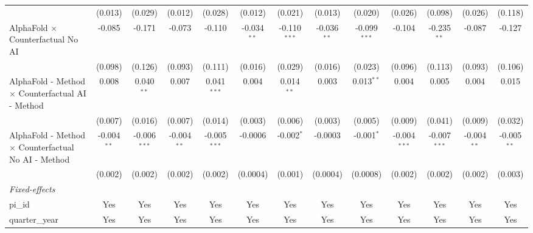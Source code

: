 \begin{tabular}{lcccccccccccc}
                                                              & (0.013)       & (0.029)        & (0.012)       & (0.028)        & (0.012)       & (0.021)        & (0.013)       & (0.020)        & (0.026)        & (0.098)        & (0.026)       & (0.118)\\   
   AlphaFold $\times$ Counterfactual No AI                    & -0.085        & -0.171         & -0.073        & -0.110         & -0.034$^{**}$ & -0.110$^{***}$ & -0.036$^{**}$ & -0.099$^{***}$ & -0.104         & -0.235$^{**}$  & -0.087        & -0.127\\   
                                                              & (0.098)       & (0.126)        & (0.093)       & (0.111)        & (0.016)       & (0.029)        & (0.016)       & (0.023)        & (0.096)        & (0.113)        & (0.093)       & (0.106)\\   
   AlphaFold - Method $\times$ Counterfactual AI - Method     & 0.008         & 0.040$^{**}$   & 0.007         & 0.041$^{***}$  & 0.004         & 0.014$^{**}$   & 0.003         & 0.013$^{**}$   & 0.004          & 0.005          & 0.004         & 0.015\\   
                                                              & (0.007)       & (0.016)        & (0.007)       & (0.014)        & (0.003)       & (0.006)        & (0.003)       & (0.005)        & (0.009)        & (0.041)        & (0.009)       & (0.032)\\   
   AlphaFold - Method $\times$ Counterfactual No AI - Method  & -0.004$^{**}$ & -0.006$^{***}$ & -0.004$^{**}$ & -0.005$^{***}$ & -0.0006       & -0.002$^{*}$   & -0.0003       & -0.001$^{*}$   & -0.004$^{***}$ & -0.007$^{***}$ & -0.004$^{**}$ & -0.005$^{**}$\\   
                                                              & (0.002)       & (0.002)        & (0.002)       & (0.002)        & (0.0004)      & (0.001)        & (0.0004)      & (0.0008)       & (0.002)        & (0.002)        & (0.002)       & (0.003)\\   
   \midrule
   \emph{Fixed-effects}\\
   pi\_id                                                     & Yes           & Yes            & Yes           & Yes            & Yes           & Yes            & Yes           & Yes            & Yes            & Yes            & Yes           & Yes\\  
   quarter\_year                                              & Yes           & Yes            & Yes           & Yes            & Yes           & Yes            & Yes           & Yes            & Yes            & Yes            & Yes           & Yes\\  

\end{tabular}
